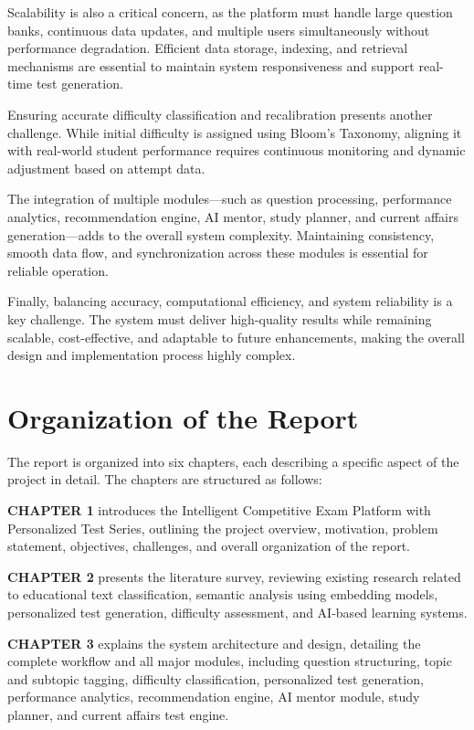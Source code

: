 \begin{sloppypar}
Scalability is also a critical concern, as the platform must handle large question banks, continuous data updates, and multiple users simultaneously without performance degradation. Efficient data storage, indexing, and retrieval mechanisms are essential to maintain system responsiveness and support real-time test generation.

Ensuring accurate difficulty classification and recalibration presents another challenge. While initial difficulty is assigned using Bloom's Taxonomy, aligning it with real-world student performance requires continuous monitoring and dynamic adjustment based on attempt data.

The integration of multiple modules---such as question processing, performance analytics, recommendation engine, AI mentor, study planner, and current affairs generation---adds to the overall system complexity. Maintaining consistency, smooth data flow, and synchronization across these modules is essential for reliable operation.

Finally, balancing accuracy, computational efficiency, and system reliability is a key challenge. The system must deliver high-quality results while remaining scalable, cost-effective, and adaptable to future enhancements, making the overall design and implementation process highly complex.

\section{Organization of the Report}

The report is organized into six chapters, each describing a specific aspect of the project in detail. The chapters are structured as follows:

\textbf{CHAPTER 1} introduces the Intelligent Competitive Exam Platform with Personalized Test Series, outlining the project overview, motivation, problem statement, objectives, challenges, and overall organization of the report.

\textbf{CHAPTER 2} presents the literature survey, reviewing existing research related to educational text classification, semantic analysis using embedding models, personalized test generation, difficulty assessment, and AI-based learning systems.

\textbf{CHAPTER 3} explains the system architecture and design, detailing the complete workflow and all major modules, including question structuring, topic and subtopic tagging, difficulty classification, personalized test generation, performance analytics, recommendation engine, AI mentor module, study planner, and current affairs test engine.


\end{sloppypar}
